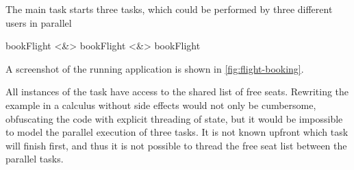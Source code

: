 \begin{example}
The main task starts three  tasks,
which could be performed by three different users in parallel
\begin{TASK}
  bookFlight <&> bookFlight <&> bookFlight
\end{TASK}
A screenshot of the running application is shown in \cref{fig:flight-booking}.

All instances of the  task have access to the shared list of free seats.
Rewriting the example in a calculus without side effects would not only be cumbersome,
obfuscating the code with explicit threading of state,
but it would be impossible to model the parallel execution of three  tasks.
It is not known upfront which task will finish first,
and thus it is not possible to thread the free seat list between the parallel tasks.

\end{example}
